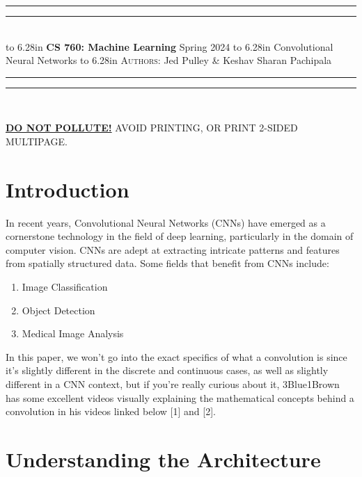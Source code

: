 \documentclass{article}
\newcommand{\lecture}[2]{
\pagestyle{myheadings}
\thispagestyle{plain}
\newpage
\noindent
\begin{center}
\rule{\textwidth}{1.6pt}\vspace*{-\baselineskip}\vspace*{2pt} %
\rule{\textwidth}{0.4pt}\\[1\baselineskip] %
\vbox{\vspace{2mm}
\hbox to 6.28in { {\bf CS 760: Machine Learning} \hfill Spring 2024 }
\vspace{4mm}
\hbox to 6.28in { {\Large \hfill #1  \hfill} }
\vspace{4mm}
\hbox to 6.28in { {\scshape Authors:}  #2 \hfill }}
\vspace{-2mm}
\rule{\textwidth}{0.4pt}\vspace*{-\baselineskip}\vspace{3.2pt} %
\rule{\textwidth}{1.6pt}\\[\baselineskip] %
\end{center}
\vspace*{4mm}
}
\begin{document}
\lecture{Convolutional Neural Networks}{Jed Pulley \& Keshav Sharan Pachipala}

\begin{center}
{\Large {\sf \underline{\textbf{DO NOT POLLUTE!}} AVOID PRINTING, OR PRINT 2-SIDED MULTIPAGE.}}
\end{center}


\section{Introduction}
    In recent years, Convolutional Neural Networks (CNNs) have emerged as a cornerstone technology in the field of deep learning, particularly in the domain of computer vision. CNNs are adept at extracting intricate patterns and features from spatially structured data. Some fields that benefit from CNNs include:
        \begin{enumerate}
            \item Image Classification
            \item Object Detection
            \item Medical Image Analysis
        \end{enumerate}
    
    In this paper, we won't go into the exact specifics of what a convolution is since it's slightly different in the discrete and continuous cases, as well as slightly different in a CNN context, but if you're really curious about it, 3Blue1Brown has some excellent videos visually explaining the mathematical concepts behind a convolution in his videos linked below [1] and [2].

\section{Understanding the Architecture}
\end{document}
